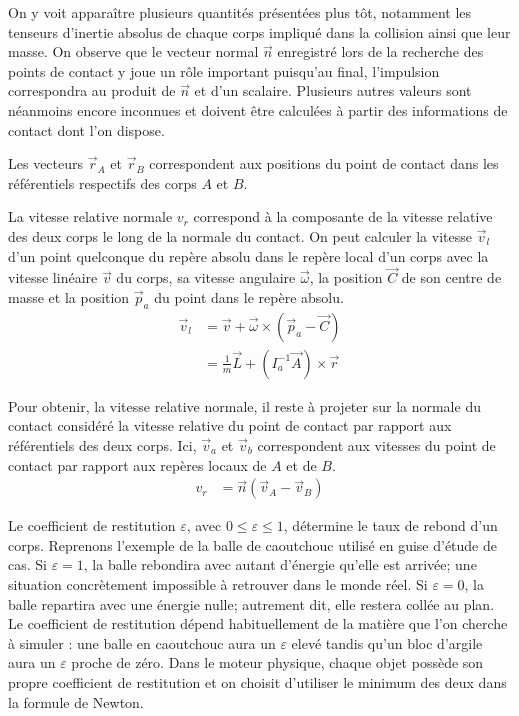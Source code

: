On y voit apparaître plusieurs quantités présentées plus tôt,
notamment les tenseurs d'inertie absolus de chaque corps impliqué dans
la collision ainsi que leur masse. On observe que le vecteur normal
$\vec{n}$ enregistré lors de la recherche des points de contact y joue
un rôle important puisqu'au final, l'impulsion correspondra au produit
de $\vec{n}$ et d'un scalaire. Plusieurs autres valeurs sont néanmoins
encore inconnues et doivent être calculées à partir des informations
de contact dont l'on dispose.

Les vecteurs $\vec{r}_A$ et $\vec{r}_B$ correspondent aux positions du
point de contact dans les référentiels respectifs des corps $A$ et $B$.

La vitesse relative normale $v_r$ correspond à la composante de la
vitesse relative des deux corps le long de la normale du contact. On
peut calculer la vitesse $\vec{v}_l$ d'un point quelconque du repère
absolu dans le repère local d'un corps avec la vitesse linéaire
$\vec{v}$ du corps, sa vitesse angulaire $\vec{\omega}$, la position
$\vec{C}$ de son centre de masse et la position $\vec{p}_a$ du point
dans le repère absolu.
\begin{align*}
  \vec{v}_l &= \vec{v} + \vec{\omega} \times (\vec{p}_a - \vec{C}) \\
            &= \frac{1}{m} \vec{L} + (I^{-1}_a \vec{A}) \times \vec{r}
\end{align*}

Pour obtenir, la vitesse relative normale, il reste à projeter sur la
normale du contact considéré la vitesse relative du point de contact
par rapport aux référentiels des deux corps. Ici, $\vec{v}_a$ et
$\vec{v}_b$ correspondent aux vitesses du point de contact par rapport
aux repères locaux de $A$ et de $B$.
\begin{align*}
  v_r &= \vec{n} (\vec{v}_{A} - \vec{v}_{B})
\end{align*}

Le coefficient de restitution $\varepsilon$, avec $0 \leq \varepsilon
\leq 1$, détermine le taux de rebond d'un corps. Reprenons l'exemple
de la balle de caoutchouc utilisé en guise d'étude de cas. Si
$\varepsilon = 1$, la balle rebondira avec autant d'énergie qu'elle
est arrivée; une situation concrètement impossible à retrouver dans le
monde réel. Si $\varepsilon = 0$, la balle repartira avec une énergie
nulle; autrement dit, elle restera collée au plan. Le coefficient de
restitution dépend habituellement de la matière que l'on cherche à
simuler : une balle en caoutchouc aura un $\varepsilon$ elevé tandis
qu'un bloc d'argile aura un $\varepsilon$ proche de zéro. Dans le
moteur physique, chaque objet possède son propre coefficient de
restitution et on choisit d'utiliser le minimum des deux dans la
formule de Newton.


